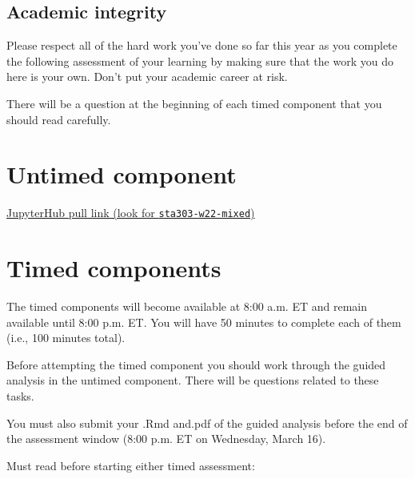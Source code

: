 \documentclass[
  openany]{book}
\begin{document}
\hypertarget{academic-integrity-2}{%
\subsection{Academic integrity}\label{academic-integrity-2}}

Please respect all of the hard work you've done so far this year as you complete the following assessment of your learning by making sure that the work you do here is your own. Don't put your academic career at risk.

There will be a question at the beginning of each timed component that you should read carefully.

\hypertarget{untimed-component-1}{%
\section{Untimed component}\label{untimed-component-1}}

\href{https://jupyter.utoronto.ca/hub/user-redirect/git-pull?repo=https\%3A\%2F\%2Fgithub.com\%2Fsta303-bolton\%2Fsta303-w22-mixed\&urlpath=rstudio\%2F}{JupyterHub pull link (look for \texttt{sta303-w22-mixed})}

\hypertarget{timed-components}{%
\section{Timed components}\label{timed-components}}

The timed components will become available at 8:00 a.m. ET and remain available until 8:00 p.m. ET. You will have 50 minutes to complete each of them (i.e., 100 minutes total).

Before attempting the timed component you should work through the guided analysis in the untimed component. There will be questions related to these tasks.

You must also submit your .Rmd and.pdf of the guided analysis before the end of the assessment window (8:00 p.m. ET on Wednesday, March 16).

Must read before starting either timed assessment:
\end{document}
